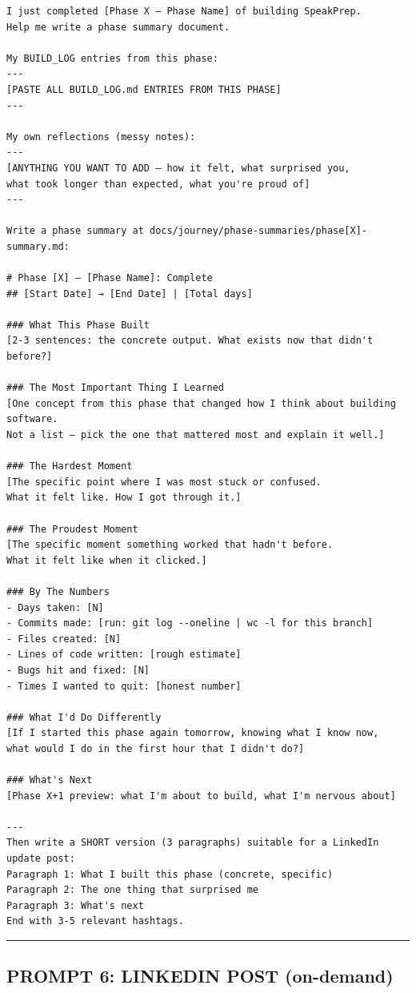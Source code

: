 \documentclass[
  11pt,
]{article}
\begin{document}
\begin{lstlisting}
I just completed [Phase X — Phase Name] of building SpeakPrep.
Help me write a phase summary document.

My BUILD_LOG entries from this phase:
---
[PASTE ALL BUILD_LOG.md ENTRIES FROM THIS PHASE]
---

My own reflections (messy notes):
---
[ANYTHING YOU WANT TO ADD — how it felt, what surprised you,
what took longer than expected, what you're proud of]
---

Write a phase summary at docs/journey/phase-summaries/phase[X]-summary.md:

# Phase [X] — [Phase Name]: Complete
## [Start Date] → [End Date] | [Total days]

### What This Phase Built
[2-3 sentences: the concrete output. What exists now that didn't before?]

### The Most Important Thing I Learned
[One concept from this phase that changed how I think about building software.
Not a list — pick the one that mattered most and explain it well.]

### The Hardest Moment
[The specific point where I was most stuck or confused.
What it felt like. How I got through it.]

### The Proudest Moment
[The specific moment something worked that hadn't before.
What it felt like when it clicked.]

### By The Numbers
- Days taken: [N]
- Commits made: [run: git log --oneline | wc -l for this branch]
- Files created: [N]
- Lines of code written: [rough estimate]
- Bugs hit and fixed: [N]
- Times I wanted to quit: [honest number]

### What I'd Do Differently
[If I started this phase again tomorrow, knowing what I know now,
what would I do in the first hour that I didn't do?]

### What's Next
[Phase X+1 preview: what I'm about to build, what I'm nervous about]

---
Then write a SHORT version (3 paragraphs) suitable for a LinkedIn update post:
Paragraph 1: What I built this phase (concrete, specific)
Paragraph 2: The one thing that surprised me
Paragraph 3: What's next
End with 3-5 relevant hashtags.
\end{lstlisting}

\begin{center}\rule{0.5\linewidth}{0.5pt}\end{center}

\hypertarget{prompt-6-linkedin-post-on-demand}{%
\subsection{PROMPT 6: LINKEDIN POST
(on-demand)}\label{prompt-6-linkedin-post-on-demand}}
\end{document}
